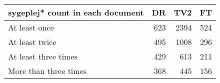 \begin{tabular}{lrrr}
\toprule
sygeplej* count in each document &  DR &  TV2 &  FT \\
\midrule
                   At least once & 623 & 2394 & 524 \\
                  At least twice & 495 & 1008 & 296 \\
            At least three times & 429 &  613 & 211 \\
           More than three times & 368 &  445 & 156 \\
\bottomrule
\end{tabular}
